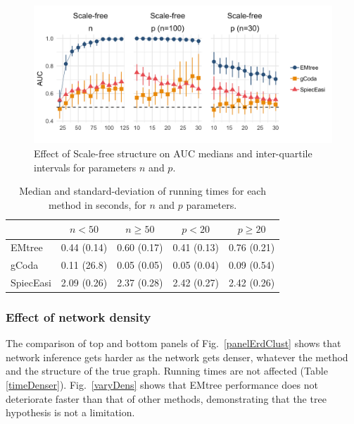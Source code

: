 \begin{figure}[H]
    \centering
    \includegraphics[width=0.7\linewidth]{figs/panel_SF.png}
    \caption{Effect of Scale-free structure on AUC medians and inter-quartile intervals for parameters $n$ and $p$.}
      \label{SFAUC}
\end{figure}


\begin{table}[H]
\centering
\begin{tabular}{l|rr|rr}
 & \multicolumn{1}{c}{$n < 50$} & \multicolumn{1}{c}{$n\geq 50$}  & \multicolumn{1}{c}{$p < 20$} & \multicolumn{1}{c}{$p\geq 20$} \\  
 \hline
  EMtree    &   0.44 (0.14)	 &   0.60 (0.17) &   0.41 (0.13) &   0.76 (0.21)   \\ 
  gCoda     &   0.11 (26.8)	 &   0.05 (0.05) &   0.05 (0.04) &   0.09 (0.54)   \\ 
  SpiecEasi &   2.09 (0.26)	 &   2.37 (0.28) &   2.42 (0.27) &   2.42 (0.26)   \\ 
   \hline
\end{tabular}
\caption{Median and standard-deviation of running times for each method in seconds, for $n$ and $p$ parameters.}
\label{timeNP}
\end{table}


\subsubsection{Effect of network density}
The comparison of top and bottom panels of Fig.~\ref{panelErdClust} shows that network inference gets harder as the network gets denser, whatever the method and the structure of the true graph. Running times are not affected (Table \ref{timeDenser}).
Fig.~\ref{varyDens} shows that EMtree performance does not deteriorate faster than that of other methods, demonstrating that the tree hypothesis is not a limitation.


